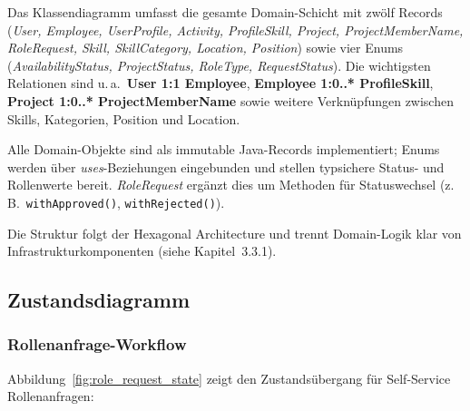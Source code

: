 Das Klassendiagramm umfasst die gesamte Domain-Schicht mit zwölf Records 
(\textit{User, Employee, UserProfile, Activity, ProfileSkill, Project, 
ProjectMemberName, RoleRequest, Skill, SkillCategory, Location, Position}) 
sowie vier Enums (\textit{AvailabilityStatus, ProjectStatus, RoleType, RequestStatus}). 
Die wichtigsten Relationen sind u.\,a.\ \textbf{User 1:1 Employee}, 
\textbf{Employee 1:0..* ProfileSkill}, \textbf{Project 1:0..* ProjectMemberName} 
sowie weitere Verknüpfungen zwischen Skills, Kategorien, Position und Location.

Alle Domain-Objekte sind als immutable Java-Records implementiert; Enums werden über 
\textit{uses}-Beziehungen eingebunden und stellen typsichere Status- und Rollenwerte bereit. 
\textit{RoleRequest} ergänzt dies um Methoden für Statuswechsel 
(z.\,B.\ \texttt{withApproved()}, \texttt{withRejected()}).

Die Struktur folgt der Hexagonal Architecture und trennt Domain-Logik klar von 
Infrastrukturkomponenten (siehe Kapitel~3.3.1).

\subsection{Zustandsdiagramm}

\subsubsection{Rollenanfrage-Workflow}

Abbildung~\ref{fig:role_request_state} zeigt den Zustandsübergang für Self-Service Rollenanfragen:

